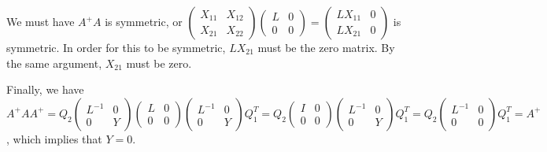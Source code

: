 \documentclass{article}
\newcommand{\openm}{\begin{pmatrix}}
\newcommand{\closem}{\end{pmatrix}}
\begin{document}
We must have $A^+A$ is symmetric, or $\openm X_{11}&X_{12}\\X_{21}&X_{22}\closem\openm L&0\\0&0\closem=\openm LX_{11}&0\\LX_{21}&0\closem$ is symmetric. In order for this to be symmetric, $LX_{21}$ must be the zero matrix. By the same argument, $X_{21}$ must be zero.

Finally, we have $A^+AA^+=Q_2\openm L^{-1}&0\\0&Y\closem\openm L&0\\0&0\closem\openm L^{-1}&0\\0&Y\closem Q_1^T=Q_2\openm I&0\\0&0\closem\openm L^{-1}&0\\0&Y\closem Q_1^T=Q_2\openm L^{-1}&0\\0&0\closem Q_1^T=A^+$, which implies that $Y=0$.
\end{document}
